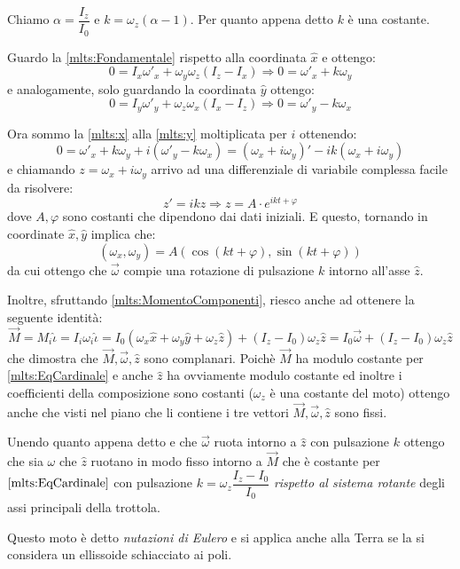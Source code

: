 \documentclass[../main.tex]{subfiles}
\begin{document}
Chiamo $\alpha=\dfrac{I_z}{I_0}$ e $k=\omega_z(\alpha-1)$. Per quanto appena detto $k$ è una costante.

Guardo la \cref{mlts:Fondamentale} rispetto alla coordinata $\hat x$ e ottengo:
\begin{equation}\label{mlts:x}
	0=I_x\omega'_x+\omega_y\omega_z(I_z-I_x)\Rightarrow 0=\omega'_x+k\omega_y
\end{equation}
e analogamente, solo guardando la coordinata $\hat y$ ottengo:
\begin{equation}\label{mlts:y}
	0=I_y\omega'_y+\omega_z\omega_x(I_x-I_z)\Rightarrow 0=\omega'_y-k\omega_x
\end{equation}

Ora sommo la \cref{mlts:x} alla \cref{mlts:y} moltiplicata per $i$ ottenendo:
\begin{equation*}
	0=\omega'_x+k\omega_y+i(\omega'_y-k\omega_x)=(\omega_x+i\omega_y)'-ik(\omega_x+i\omega_y)
\end{equation*}
e chiamando $z=\omega_x+i\omega_y$ arrivo ad una differenziale di variabile complessa facile da risolvere:
\begin{equation*}
	z'=ikz \Rightarrow z=A\cdot e^{ikt+\varphi}
\end{equation*}
dove $A,\varphi$ sono costanti che dipendono dai dati iniziali. E questo, tornando in coordinate $\hat x,\hat y$ implica che:
\begin{equation}\label{mlts:MotoOmega}
	(\omega_x,\omega_y)=A(\cos(kt+\varphi),\sin(kt+\varphi))
\end{equation}
da cui ottengo che $\vec\omega$ compie una rotazione di pulsazione $k$ intorno all'asse $\hat z$.

Inoltre, sfruttando \cref{mlts:MomentoComponenti}, riesco anche ad ottenere la seguente identità:
\begin{equation}\label{mlts:Complanarita}
	\overrightarrow M = M_i\hat\iota = I_i \omega_i\hat\iota= 
	I_0\left(\omega_x\hat x+\omega_y\hat y+\omega_z\hat z\right)+(I_z-I_0)\omega_z \hat z=
	I_0\vec\omega + (I_z-I_0)\omega_z \hat z
\end{equation}
che dimostra che $\overrightarrow{M},\vec\omega,\hat z$ sono complanari. Poichè $\vec M$ ha modulo costante per \cref{mlts:EqCardinale} e anche $\hat z$ ha ovviamente modulo costante ed inoltre i coefficienti della composizione sono costanti ($\omega_z$ è una costante del moto) ottengo anche che visti nel piano che li contiene i tre vettori $\overrightarrow M, \vec\omega, \hat z$ sono fissi.

Unendo quanto appena detto e che $\vec\omega$ ruota intorno a $\hat z$ con pulsazione $k$ ottengo che sia $\omega$ che $\hat z$ ruotano in modo fisso intorno a $\vec M$ che è costante per $\cref{mlts:EqCardinale}$ con pulsazione $k=\omega_z\dfrac{I_z-I_0}{I_0}$ \emph{rispetto al sistema rotante} degli assi principali della trottola.

Questo moto è detto \emph{nutazioni di Eulero} e si applica anche alla Terra se la si considera un ellissoide schiacciato ai poli.
\end{document}
